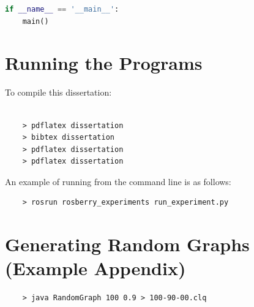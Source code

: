 \documentclass{l4proj}
\begin{document}
\begin{appendices}
\begin{lstlisting}[language=Python]
if __name__ == '__main__':
    main()
\end{lstlisting}
\fi
\chapter{Running the Programs}

To compile this dissertation:
\begin{verbatim}

	> pdflatex dissertation
	> bibtex dissertation
	> pdflatex dissertation
    > pdflatex dissertation

\end{verbatim}


An example of running from the command line is as follows:
\begin{verbatim}
	> rosrun rosberry_experiments run_experiment.py
\end{verbatim}


\chapter{Generating Random Graphs (Example Appendix)}
\label{sec:randomGraph}

\begin{verbatim}
	> java RandomGraph 100 0.9 > 100-90-00.clq
\end{verbatim}
\end{appendices}




\end{document}
